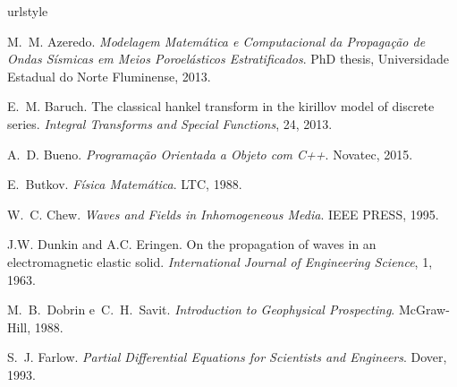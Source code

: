 \documentclass[12pt,a4paper,oneside]{abntex2}
\begin{document}
\listoffigures

\newpage

\tableofcontents

\textual











%

\begin{thebibliography}{25}
\providecommand{\natexlab}[1]{#1}
\providecommand{\url}[1]{\texttt{#1}}
\expandafter\ifx\csname urlstyle\endcsname\relax
  \providecommand{\doi}[1]{doi: #1}\else
  \providecommand{\doi}{doi: \begingroup \urlstyle{rm}\Url}\fi

M.~M. Azeredo.
\newblock \emph{Modelagem Matem\'atica e Computacional da Propaga\c{c}\~ao de
  Ondas S\'ismicas em Meios Poroel\'asticos Estratificados}.
\newblock PhD thesis, Universidade Estadual do Norte Fluminense, 2013.

E.~M. Baruch.
\newblock The classical hankel transform in the kirillov model of discrete
  series.
\newblock \emph{Integral Transforms and Special Functions}, 24, 2013.

A.~D. Bueno.
\newblock \emph{Programa\c{c}\~ao Orientada a Objeto com C++}.
\newblock Novatec, 2015.

E.~Butkov.
\newblock \emph{F\'isica Matem\'atica}.
\newblock LTC, 1988.

W.~C. Chew.
\newblock \emph{Waves and Fields in Inhomogeneous Media}.
\newblock IEEE PRESS, 1995.

J.W. Dunkin and A.C. Eringen.
\newblock On the propagation of waves in an electromagnetic elastic solid.
\newblock \emph{International Journal of Engineering Science}, 1, 1963.

M.~B.~Dobrin e~C.~H.~Savit.
\newblock \emph{Introduction to Geophysical Prospecting}.
\newblock McGraw-Hill, 1988.

S.~J. Farlow.
\newblock \emph{Partial Differential Equations for Scientists and Engineers}.
\newblock Dover, 1993.


\end{thebibliography}
\end{document}
